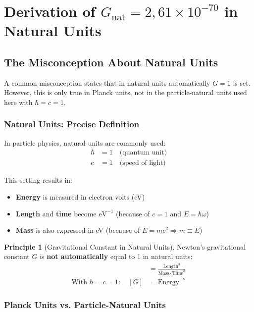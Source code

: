\documentclass[12pt,a4paper]{article}
\theoremstyle{definition}
\newtheorem{principle}{Principle}
\begin{document}
\section{Derivation of $G_{\text{nat}} = 2{,}61 \times 10^{-70}$ in Natural Units}

\subsection{The Misconception About Natural Units}

\begin{important}
	A common misconception states that in natural units automatically $G = 1$ is set. However, this is only true in Planck units, not in the particle-natural units used here with $\hbar = c = 1$.
\end{important}

\subsubsection{Natural Units: Precise Definition}

In particle physics, natural units are commonly used:
\begin{align}
	\hbar &= 1 \quad \text{(quantum unit)} \\
	c &= 1 \quad \text{(speed of light)}
\end{align}

This setting results in:
\begin{itemize}
	\item \textbf{Energy} is measured in electron volts (eV)
	\item \textbf{Length} and \textbf{time} become $\text{eV}^{-1}$ (because of $c = 1$ and $E = \hbar \omega$)
	\item \textbf{Mass} is also expressed in eV (because of $E = mc^2 \Rightarrow m \equiv E$)
\end{itemize}

\begin{principle}[Gravitational Constant in Natural Units]
	Newton's gravitational constant $G$ is \textbf{not automatically} equal to 1 in natural units:
	\begin{align}
		[G] &= \frac{\text{Length}^3}{\text{Mass} \cdot \text{Time}^2} \\
		\text{With } \hbar = c = 1: \quad [G] &= \text{Energy}^{-2}
	\end{align}
\end{principle}

\subsubsection{Planck Units vs. Particle-Natural Units}
\end{document}
